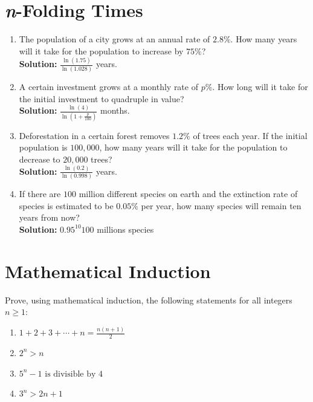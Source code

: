 \documentclass{article}
\begin{document}
\section{\textit{n}-Folding Times}

\begin{enumerate}[leftmargin = 0.5cm, label = \arabic*., rightmargin = 0.2cm]

    \item The population of a city grows at an annual rate of $2.8\%$. How many years will it take for the population to increase by $75\%$? \\
    \textbf{Solution:} $\frac{\ln(1.75)}{\ln\left(1.028\right)}$  years.

    \item A certain investment grows at a monthly rate of $p\%$. How long will it take for the initial investment to quadruple in value? \\
    \textbf{Solution:} $\frac{\ln(4)}{\ln\left(1 + \frac{p}{100}\right)}$ months.

    \item Deforestation in a certain forest removes $1.2\%$ of trees each year. If the initial population is $100,000$, how many years will it take for the population to decrease to $20,000$ trees? \\
    \textbf{Solution:} $\frac{\ln(0.2)}{\ln\left(0.998\right)}$ years.

    \item If there are $100$ million different species on earth and the extinction rate of species is estimated to be $0.05\%$ per year, how many species will remain ten years from now? \\
    \textbf{Solution:} $0.95^10 100$ millions species
    
\end{enumerate}

\section{Mathematical Induction}

Prove, using mathematical induction, the following statements for all integers \( n \geq 1 \):

\begin{enumerate}[leftmargin = 0.5cm, label = (\alph*), rightmargin = 0.2cm]

    \item $1 + 2 + 3 + \cdots + n = \frac{n(n+1)}{2}$

    \item $2^n > n$

    \item $5^n - 1 \text{ is divisible by } 4$

    \item $3^n > 2n + 1$

\end{enumerate}
\end{document}
